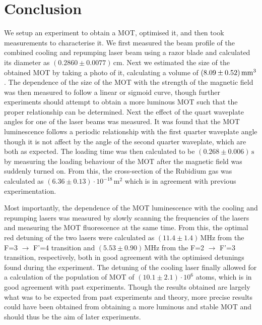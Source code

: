 \documentclass[twocolumn]{article}
\begin{document}
\section{Conclusion}
We setup an experiment to obtain a MOT, optimised it, and then took measurements to characterise it. We first measured the beam profile of the combined cooling and repumping laser beam using a razor blade and calculated its diameter as $(0.2860 \pm 0.0077) \, \text{cm}$. Next we estimated the size of the obtained MOT by taking a photo of it, calculating a volume of $\SI[separate-uncertainty = true]{8.09 \pm 0.52 }{\cubic\milli\meter}$. The dependence of the size of the MOT with the strength of the magnetic field was then measured to follow a linear or sigmoid curve, though further experiments should attempt to obtain a more luminous MOT such that the proper relationship can be determined. Next the effect of the quart waveplate angles for one of the laser beams was measured. It was found that the MOT luminescence follows a periodic relationship with the first quarter waveplate angle though it is not affect by the angle of the second quarter waveplate, which are both as expected. The loading time was then calculated to be $(0.268 \pm 0.006) \, \text{s}$ by measuring the loading behaviour of the MOT after the magnetic field was suddenly turned on. From this, the cross-section of the Rubidium gas was calculated as $(6.36 \pm 0.13) \cdot 10^{-18} \, \text{m}^2$ which is in agreement with previous experimentation.\\

\par Most importantly, the dependence of the MOT luminescence with the cooling and repumping lasers was measured by slowly scanning the frequencies of the lasers and measuring the MOT fluorescence at the same time. From this, the optimal red detuning of the two lasers were calculated as $(11.4 \pm 1.4) \, \text{MHz}$ from the F=3 $\to$ F'=4 transition and $(5.53 \pm 0.90)\, \text{MHz}$ from the F=2 $\to$ F'=3 transition, respectively, both in good agreement with the optimised detunings found during the experiment. The detuning of the cooling laser finally allowed for a calculation of the population of MOT of $(10.1 \pm 2.1)\cdot 10^6$ atoms, which is in good agreement with past experiments. Though the results obtained are largely what was to be expected from past experiments and theory, more precise results could have been obtained from obtaining a more luminous and stable MOT and should thus be the aim of later experiments.
\end{document}

